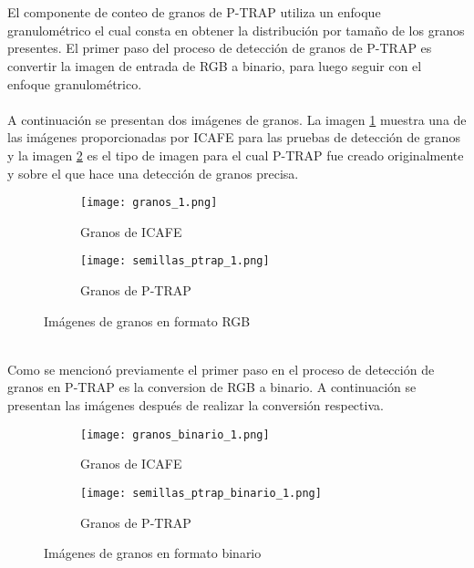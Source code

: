 \\\\
El componente de conteo de granos de P-TRAP utiliza un enfoque granulom\'etrico el cual consta en obtener la distribuci\'on por tama\~no de los granos presentes. El primer paso del proceso de detecci\'on de granos de P-TRAP es convertir la imagen de entrada de RGB a binario, para luego seguir con el enfoque granulom\'etrico. 
\\\\
A continuaci\'on se presentan dos im\'agenes de granos. La imagen \ref{fig:granos_icafe_propuesta} muestra una de las im\'agenes proporcionadas por ICAFE para las pruebas de detecci\'on de granos y la imagen \ref{fig2:granos_ptrap_propuesta} es el tipo de imagen para el cual P-TRAP fue creado originalmente y sobre el que hace una detecci\'on de granos precisa.
\begin{figure}[!ht]
  \centering
  \begin{subfigure}[b]{180pt}
  	\centering
    \texttt{[image: granos\_1.png]}
    \caption{Granos de ICAFE}
    \label{fig:granos_icafe_propuesta}
  \end{subfigure}
  \begin{subfigure}[b]{170pt}
    \texttt{[image: semillas\_ptrap\_1.png]}
    \caption{Granos de P-TRAP}
    \label{fig2:granos_ptrap_propuesta}
  \end{subfigure}
  \caption{Im\'agenes de granos en formato RGB}
  \label{granos_sin_procesar_propuesta}
\end{figure}
\\
Como se mencion\'o previamente el primer paso en el proceso de detecci\'on de granos en P-TRAP es la conversion de RGB a binario. A continuaci\'on se presentan las im\'agenes despu\'es de realizar la conversi\'on respectiva. 
\begin{figure}[!ht]
  \centering
  \begin{subfigure}[b]{180pt}
  	\centering
    \texttt{[image: granos\_binario\_1.png]}
    \caption{Granos de ICAFE}
    \label{fig:granos_icafe_binario_propuesta}
  \end{subfigure}
  \begin{subfigure}[b]{170pt}
    \texttt{[image: semillas\_ptrap\_binario\_1.png]}
    \caption{Granos de P-TRAP}
    \label{fig2:granos_ptrap_binario_propuesta}
  \end{subfigure}
  \caption{Im\'agenes de granos en formato binario}
  \label{granos_procesados_propuesta}
\end{figure}
